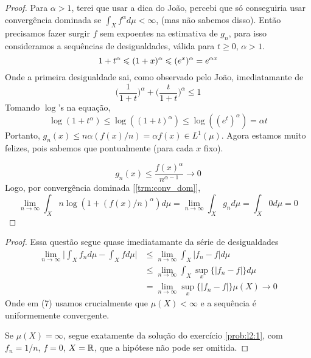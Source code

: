 \begin{proof}
    Para $\alpha > 1$, terei que usar a dica do João, percebi que só conseguiria usar convergência dominada se $\int_X f^\alpha d\mu < \infty$, (mas não sabemos disso). 
    Então precisamos fazer surgir $f$ sem expoentes na estimativa de $g_n$, para isso consideramos a sequências de desigualdades, válida para $t \geq 0$, $\alpha > 1$.
    $$
        1 + t^\alpha \leq (1 + x)^\alpha \leq (e^x)^\alpha = e^{\alpha x}\\
    $$
    Onde a primeira desigualdade sai, como observado pelo João, imediatamante de 
    $$\bigg(\frac{1}{1 + t}\bigg)^\alpha + \bigg(\frac{t}{1 + t}\bigg)^\alpha \leq 1$$
    Tomando $\log$'s na equação,
    $$
        \log(1 + t^\alpha) \leq \log((1 + t)^\alpha) \leq \log((e^t)^\alpha) = \alpha t
    $$
    Portanto, $g_n(x) \leq n \alpha (f(x)/n) = \alpha f(x) \in L^1(\mu)$. Agora estamos muito felizes, pois sabemos que pontualmente (para cada $x$ fixo).
    
    $$g_n(x) \leq \frac{f(x)^\alpha}{n^{\alpha -1}} \to 0$$
    Logo, por convergência dominada [\ref{trm:conv_dom}],
    $$\lim_{n \to \infty} \int_X n\log(1 + (f(x)/n)^\alpha) d\mu= \lim_{n\to\infty} \int_X g_nd\mu = \int_X 0d\mu = 0$$
\end{proof}


\begin{problem}
    \label{prob:l2:4}
\end{problem}

\begin{proof}
    Essa questão segue quase imediatamante da série de desigualdades
    \begin{align}
        \lim_{n\to\infty} \bigg|\int_X f_n d\mu - \int_Xfd\mu \bigg| &\leq \lim_{n\to\infty} \int_X |f_n - f| d\mu\\
        &\leq \lim_{n\to\infty} \int_X \sup_x\{|f_n - f|\}d\mu\\
        &= \lim_{n\to\infty} \sup_x\{|f_n - f|\} \mu(X) \to 0
    \end{align}
    Onde em (7) usamos crucialmente que $\mu(X) < \infty$ e a sequência é uniformemente convergente.

    Se $\mu(X) = \infty$, segue exatamente da solução do exercício \ref{prob:l2:1}, com $f_n = 1/n$, $f = 0$, $X = \R$, que a hipótese não pode ser omitida.
\end{proof}

\begin{problem}
    \label{prob:l2:5}
\end{problem}

